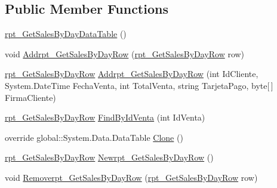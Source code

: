 \subsection*{Public Member Functions}
\begin{DoxyCompactItemize}
\item 
\hyperlink{classprj_progra_i_i_i_1_1_prj_progra_i_i_i_data_set_1_1rpt___get_sales_by_day_data_table_acca9559343110b5b458f9d372477b9bd}{rpt\+\_\+\+Get\+Sales\+By\+Day\+Data\+Table} ()
\item 
void \hyperlink{classprj_progra_i_i_i_1_1_prj_progra_i_i_i_data_set_1_1rpt___get_sales_by_day_data_table_a37945b2e5a98ca22dc96fe1054f95ddc}{Addrpt\+\_\+\+Get\+Sales\+By\+Day\+Row} (\hyperlink{classprj_progra_i_i_i_1_1_prj_progra_i_i_i_data_set_1_1rpt___get_sales_by_day_row}{rpt\+\_\+\+Get\+Sales\+By\+Day\+Row} row)
\item 
\hyperlink{classprj_progra_i_i_i_1_1_prj_progra_i_i_i_data_set_1_1rpt___get_sales_by_day_row}{rpt\+\_\+\+Get\+Sales\+By\+Day\+Row} \hyperlink{classprj_progra_i_i_i_1_1_prj_progra_i_i_i_data_set_1_1rpt___get_sales_by_day_data_table_a046250b280d3998a33407ba53e230b5d}{Addrpt\+\_\+\+Get\+Sales\+By\+Day\+Row} (int Id\+Cliente, System.\+Date\+Time Fecha\+Venta, int Total\+Venta, string Tarjeta\+Pago, byte\mbox{[}$\,$\mbox{]} Firma\+Cliente)
\item 
\hyperlink{classprj_progra_i_i_i_1_1_prj_progra_i_i_i_data_set_1_1rpt___get_sales_by_day_row}{rpt\+\_\+\+Get\+Sales\+By\+Day\+Row} \hyperlink{classprj_progra_i_i_i_1_1_prj_progra_i_i_i_data_set_1_1rpt___get_sales_by_day_data_table_adecc48223b37235d3837b7f0c895d033}{Find\+By\+Id\+Venta} (int Id\+Venta)
\item 
override global\+::\+System.\+Data.\+Data\+Table \hyperlink{classprj_progra_i_i_i_1_1_prj_progra_i_i_i_data_set_1_1rpt___get_sales_by_day_data_table_aeb9181a316dd54a548607a9cd8fbc16c}{Clone} ()
\item 
\hyperlink{classprj_progra_i_i_i_1_1_prj_progra_i_i_i_data_set_1_1rpt___get_sales_by_day_row}{rpt\+\_\+\+Get\+Sales\+By\+Day\+Row} \hyperlink{classprj_progra_i_i_i_1_1_prj_progra_i_i_i_data_set_1_1rpt___get_sales_by_day_data_table_a03f70b69b1f8cd651af98cdd77d2e26b}{Newrpt\+\_\+\+Get\+Sales\+By\+Day\+Row} ()
\item 
void \hyperlink{classprj_progra_i_i_i_1_1_prj_progra_i_i_i_data_set_1_1rpt___get_sales_by_day_data_table_a2efcb37676c8d7686f9da8815f1846e4}{Removerpt\+\_\+\+Get\+Sales\+By\+Day\+Row} (\hyperlink{classprj_progra_i_i_i_1_1_prj_progra_i_i_i_data_set_1_1rpt___get_sales_by_day_row}{rpt\+\_\+\+Get\+Sales\+By\+Day\+Row} row)
\end{DoxyCompactItemize}
